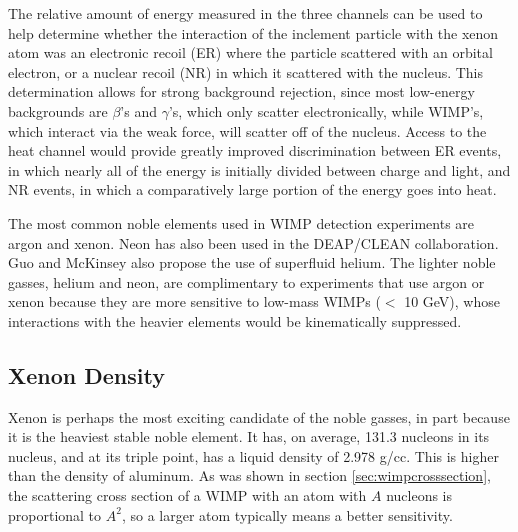 The relative amount of energy measured in the three channels can be used to help determine whether the interaction of the inclement particle with the xenon atom was an electronic recoil (ER) where the particle scattered with an orbital electron, or a nuclear recoil (NR) in which it scattered with the nucleus. This determination allows for strong background rejection, since most low-energy backgrounds are $\beta$'s and $\gamma$'s, which only scatter electronically, while WIMP's, which interact via the weak force, will scatter off of the nucleus. Access to the heat channel would provide greatly improved discrimination between ER events, in which nearly all of the energy is initially divided between charge and light, and NR events, in which a comparatively large portion of the energy goes into heat.

The most common noble elements used in WIMP detection experiments are argon and xenon. Neon has also been used in the DEAP/CLEAN collaboration\cite{clean1,clean2}. Guo and McKinsey also propose the use of superfluid helium\cite{he_dm}. The lighter noble gasses, helium and neon, are complimentary to experiments that use argon or xenon because they are more sensitive to low-mass WIMPs ($<$ 10 GeV), whose interactions with the heavier elements would be kinematically suppressed.

\subsection{Xenon Density}
Xenon is perhaps the most exciting candidate of the noble gasses, in part because it is the heaviest stable noble element. It has, on average, 131.3 nucleons in its nucleus, and at its triple point, has a liquid density of 2.978 g/cc. This is higher than the density of aluminum. As was shown in section \ref{sec:wimpcrosssection}, the scattering cross section of a WIMP with an atom with $A$ nucleons is proportional to $A^2$, so a larger atom typically means a better sensitivity. 

